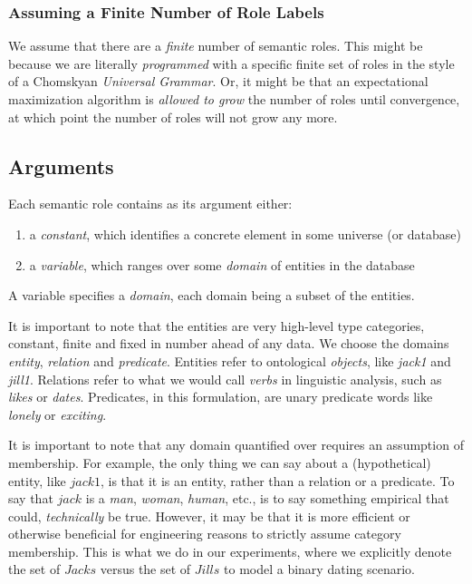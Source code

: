 \documentclass[12pt]{article}
\begin{document}
\subsubsection{Assuming a Finite Number of Role Labels}
We assume that there are a {\em finite} number of semantic roles.
This might be because we are literally {\em programmed} with a specific finite set of roles in the style of a Chomskyan {\em Universal Grammar}.
Or, it might be that an expectational maximization algorithm is {\em allowed to grow} the number of roles until convergence, at which point the number of roles will not grow any more.


\subsection{Arguments}
Each semantic role contains as its argument either:
\begin{enumerate}
    \item a \emph{constant}, which identifies a concrete element in some universe (or database)
    \item a \emph{variable}, which ranges over some \emph{domain} of entities in the database
\end{enumerate}

A variable specifies a \emph{domain}, each domain being a subset of the entities.

It is important to note that the entities are very high-level type categories, constant, finite and fixed in number ahead of any data.
We choose the domains \emph{entity}, \emph{relation} and \emph{predicate}.
Entities refer to ontological \emph{objects}, like \emph{jack1} and \emph{jill1}.
Relations refer to what we would call \emph{verbs} in linguistic analysis, such as \emph{likes} or \emph{dates}.
Predicates, in this formulation, are unary predicate words like \emph{lonely} or \emph{exciting}.

It is important to note that any domain quantified over requires an assumption of membership.
For example, the only thing we can say about a (hypothetical) entity, like \( jack1 \), is that it is an entity, rather than a relation or a predicate.
To say that \( jack \) is a \emph{man}, \emph{woman}, \emph{human}, etc., is to say something empirical that could, \emph{technically} be true.
However, it may be that it is more efficient or otherwise beneficial for engineering reasons to strictly assume category membership.
This is what we do in our experiments, where we explicitly denote the set of \( Jacks \) versus the set of \( Jills \) to model a binary dating scenario.
\end{document}

